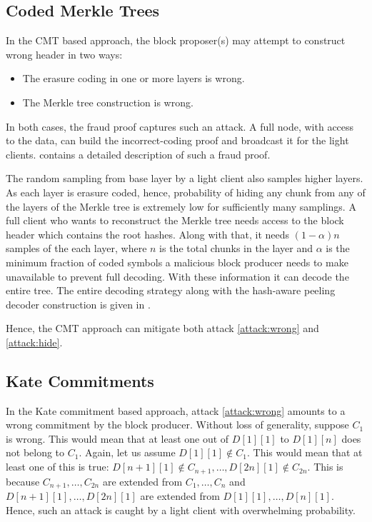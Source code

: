 \documentclass[sigconf, screen=true, nonacm]{acmart}
\begin{document}
    \subsection{Coded Merkle Trees}
        In the CMT based approach, the block proposer(s) may attempt to construct wrong header in two ways:
        \begin{itemize}
            \item The erasure coding in one or more layers is wrong. 
            \item The Merkle tree construction is wrong.
        \end{itemize}

        In both cases, the fraud proof captures such an attack. A full node, with access to the data, can build the incorrect-coding proof and broadcast it for the light clients. \cite{yu2019coded} contains a detailed description of such a fraud proof. 

        The random sampling from base layer by a light client also samples higher layers. As each layer is erasure coded, hence, probability of hiding any chunk from any of the layers of the Merkle tree is extremely low for sufficiently many samplings. A full client who wants to reconstruct the Merkle tree needs access to the block header which contains the root hashes. Along with that, it needs $(1-\alpha)n$ samples of the each layer, where $n$ is the total chunks in the layer and $\alpha$ is the minimum fraction of coded symbols a malicious block producer needs to make unavailable to prevent full decoding. With these information it can decode the entire tree. The entire decoding strategy along with the hash-aware peeling decoder construction is given in \cite{yu2019coded}. 

        Hence, the CMT approach can mitigate both attack \ref{attack:wrong} and \ref{attack:hide}. 

    \subsection{Kate Commitments}
        In the Kate commitment based approach, attack \ref{attack:wrong} amounts to a wrong commitment by the block producer. Without loss of generality, suppose $C_1$ is wrong. This would mean that at least one out of $D[1][1]$ to $D[1][n]$ does not belong to $C_1$. Again, let us assume $D[1][1] \not\in C_1$. This would mean that at least one of this is true: $D[n+1][1] \not\in C_{n+1}, \dots, D[2n][1] \not\in C_{2n}$. This is because $C_{n+1}, \dots, C_{2n}$ are extended from $C_1, \dots, C_n$ and $D[n+1][1], \dots, D[2n][1]$ are extended from $D[1][1], \dots, D[n][1]$. Hence, such an attack is caught by a light client with overwhelming probability. 
\end{document}
